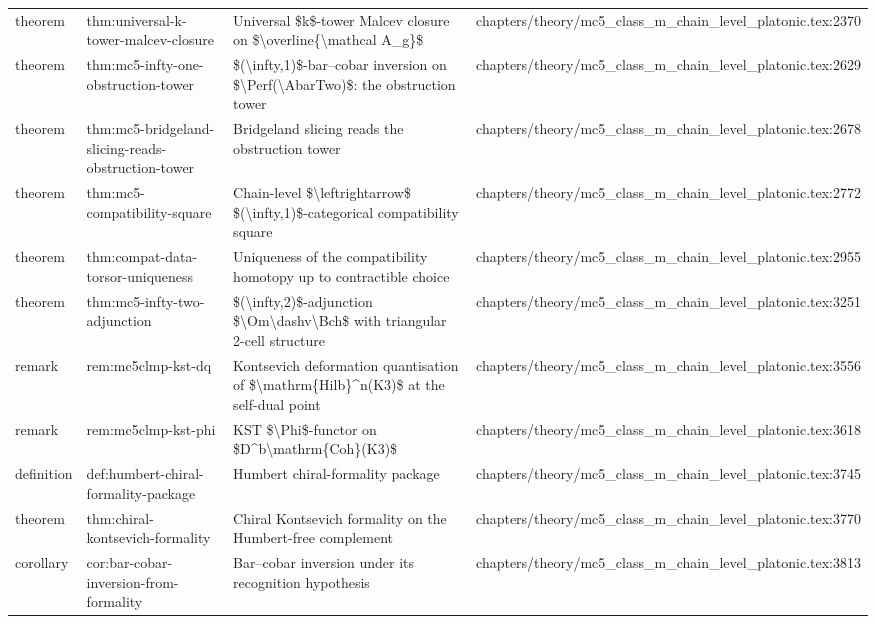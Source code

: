 \documentclass[11pt]{article}
\begin{document}
\begin{longtable}{L{0.10\textwidth}L{0.26\textwidth}L{0.42\textwidth}L{0.22\textwidth}}
theorem & thm:universal-k-tower-malcev-closure & Universal \$k\$-tower Malcev closure on \$\textbackslash{}overline\{\textbackslash{}mathcal A\_g\}\$ & chapters/theory/mc5\_class\_m\_chain\_level\_platonic.tex:2370\\
theorem & thm:mc5-infty-one-obstruction-tower & \$(\textbackslash{}infty,1)\$-bar--cobar inversion on \$\textbackslash{}Perf(\textbackslash{}AbarTwo)\$: the obstruction tower & chapters/theory/mc5\_class\_m\_chain\_level\_platonic.tex:2629\\
theorem & thm:mc5-bridgeland-slicing-reads-obstruction-tower & Bridgeland slicing reads the obstruction tower & chapters/theory/mc5\_class\_m\_chain\_level\_platonic.tex:2678\\
theorem & thm:mc5-compatibility-square & Chain-level \$\textbackslash{}leftrightarrow\$ \$(\textbackslash{}infty,1)\$-categorical compatibility square & chapters/theory/mc5\_class\_m\_chain\_level\_platonic.tex:2772\\
theorem & thm:compat-data-torsor-uniqueness & Uniqueness of the compatibility homotopy up to contractible choice & chapters/theory/mc5\_class\_m\_chain\_level\_platonic.tex:2955\\
theorem & thm:mc5-infty-two-adjunction & \$(\textbackslash{}infty,2)\$-adjunction \$\textbackslash{}Om\textbackslash{}dashv\textbackslash{}Bch\$ with triangular 2-cell structure & chapters/theory/mc5\_class\_m\_chain\_level\_platonic.tex:3251\\
remark & rem:mc5clmp-kst-dq & Kontsevich deformation quantisation of \$\textbackslash{}mathrm\{Hilb\}\textasciicircum{}n(K3)\$ at the self-dual point & chapters/theory/mc5\_class\_m\_chain\_level\_platonic.tex:3556\\
remark & rem:mc5clmp-kst-phi & KST \$\textbackslash{}Phi\$-functor on \$D\textasciicircum{}b\textbackslash{}mathrm\{Coh\}(K3)\$ & chapters/theory/mc5\_class\_m\_chain\_level\_platonic.tex:3618\\
definition & def:humbert-chiral-formality-package & Humbert chiral-formality package & chapters/theory/mc5\_class\_m\_chain\_level\_platonic.tex:3745\\
theorem & thm:chiral-kontsevich-formality & Chiral Kontsevich formality on the Humbert-free complement & chapters/theory/mc5\_class\_m\_chain\_level\_platonic.tex:3770\\
corollary & cor:bar-cobar-inversion-from-formality & Bar--cobar inversion under its recognition hypothesis & chapters/theory/mc5\_class\_m\_chain\_level\_platonic.tex:3813\\

\end{longtable}
\end{document}
